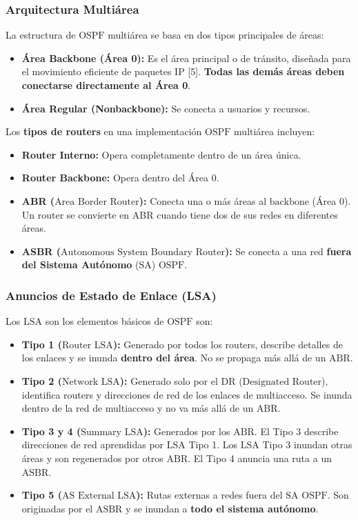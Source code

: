 \documentclass[a5paper]{book}%
\begin{document}
  \subsubsection*{Arquitectura Multiárea}
  
  La estructura de $\text{OSPF}$ multiárea se basa en dos tipos principales de áreas:
  \begin{itemize}
  	\item \textbf{Área Backbone (Área 0):} Es el área principal o de tránsito, diseñada para el movimiento eficiente de paquetes $\text{IP}$ [5]. \textbf{Todas las demás áreas deben conectarse directamente al Área 0}.
  	\item \textbf{Área Regular (Nonbackbone):} Se conecta a usuarios y recursos.
  \end{itemize}
  
  Los \textbf{tipos de routers} en una implementación $\text{OSPF}$ multiárea incluyen:
  \begin{itemize}
  	\item \textbf{Router Interno:} Opera completamente dentro de un área única.
  	\item \textbf{Router Backbone:} Opera dentro del Área 0.
  	\item \textbf{ABR ($\text{Area Border Router}$):} Conecta una o más áreas al $\text{backbone}$ (Área 0). Un router se convierte en ABR cuando tiene dos de sus redes en diferentes áreas.
  	\item \textbf{ASBR ($\text{Autonomous System Boundary Router}$):} Se conecta a una red \textbf{fuera del Sistema Autónomo} ($\text{SA}$) $\text{OSPF}$.
  \end{itemize}
  
  \subsubsection*{Anuncios de Estado de Enlace (LSA)}
  
  Los $\text{LSA}$ son los elementos básicos de $\text{OSPF}$  son:
  \begin{itemize}
  	\item \textbf{Tipo 1 ($\text{Router LSA}$):} Generado por todos los routers, describe detalles de los enlaces y se inunda \textbf{dentro del área}. No se propaga más allá de un $\text{ABR}$.
  	\item \textbf{Tipo 2 ($\text{Network LSA}$):} Generado solo por el $\text{DR}$ ($\text{Designated Router}$), identifica routers y direcciones de red de los enlaces de multiacceso. Se inunda dentro de la red de multiacceso y no va más allá de un $\text{ABR}$.
  	\item \textbf{Tipo 3 y 4 ($\text{Summary LSA}$):} Generados por los $\text{ABR}$. El Tipo 3 describe direcciones de red aprendidas por $\text{LSA}$ Tipo 1. Los $\text{LSA}$ Tipo 3 inundan otras áreas y son regenerados por otros $\text{ABR}$. El Tipo 4 anuncia una ruta a un $\text{ASBR}$.
  	\item \textbf{Tipo 5 ($\text{AS External LSA}$):} Rutas externas a redes fuera del $\text{SA}$ $\text{OSPF}$. Son originadas por el $\text{ASBR}$ y se inundan a \textbf{todo el sistema autónomo}.
  \end{itemize}
  
\end{document}

